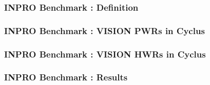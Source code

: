 
\begin{frame}
  \frametitle{INPRO Benchmark : Definition}
\end{frame}

\begin{frame}
  \frametitle{INPRO Benchmark : VISION PWRs in Cyclus}
\end{frame}

\begin{frame}
  \frametitle{INPRO Benchmark : VISION HWRs in Cyclus}
\end{frame}

\begin{frame}
  \frametitle{INPRO Benchmark : Results}
\end{frame}

